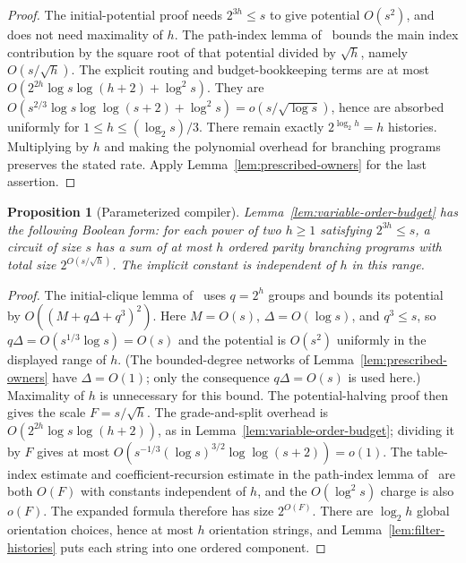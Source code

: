 \documentclass[11pt]{article}
\newtheorem{proposition}[theorem]{Proposition}
\theoremstyle{definition}
\theoremstyle{remark}
\begin{document}
\begin{proof}
The initial-potential proof needs $2^{3h}\le s$ to give potential
$O(s^2)$, and does not need maximality of $h$. The path-index lemma
of~\cite{Cruz26} bounds the main index contribution by the square
root of that potential divided by $\sqrt h$, namely $O(s/\sqrt h)$.
The explicit routing and budget-bookkeeping terms are at most
$O(2^{2h}\log s\log(h+2)+\log^2s)$. They are
$O(s^{2/3}\log s\log\log(s+2)+\log^2s)
 =o(s/\sqrt{\log s})$, hence are absorbed uniformly for
$1\le h\le(\log_2s)/3$. There remain exactly
$2^{\log_2h}=h$ histories. Multiplying by $h$ and making the
polynomial overhead for branching programs preserves the stated
rate. Apply Lemma~\ref{lem:prescribed-owners} for the last assertion.
\end{proof}

\begin{proposition}[Parameterized compiler]
\label{prop:parameterized-parity-compiler}
Lemma~\ref{lem:variable-order-budget} has the following Boolean form:
for each power of two $h\ge1$ satisfying
$2^{3h}\le s$, a circuit of size $s$ has a sum of at most $h$ ordered
parity branching programs with total size $2^{O(s/\sqrt h)}$.
The implicit constant is independent of $h$ in this range.
\end{proposition}
\begin{proof}
The initial-clique lemma of~\cite{Cruz26}
uses $q=2^h$ groups and bounds its potential by
$O((M+q\Delta+q^3)^2)$.
Here $M=O(s)$, $\Delta=O(\log s)$, and $q^3\le s$, so
$q\Delta=O(s^{1/3}\log s)=O(s)$ and the potential is $O(s^2)$
uniformly in the displayed range of $h$. (The bounded-degree networks
of Lemma~\ref{lem:prescribed-owners} have $\Delta=O(1)$; only the
consequence $q\Delta=O(s)$ is used here.)
Maximality of $h$ is unnecessary for this bound.
The potential-halving proof then gives the scale $F=s/\sqrt h$.
The grade-and-split overhead is
$O(2^{2h}\log s\log(h+2))$, as in Lemma~\ref{lem:variable-order-budget};
dividing it by $F$ gives at most
$O(s^{-1/3}(\log s)^{3/2}\log\log(s+2))=o(1)$.
The table-index estimate and coefficient-recursion estimate in the
path-index lemma of~\cite{Cruz26} are both $O(F)$ with constants
independent of $h$, and the $O(\log^2s)$ charge is also $o(F)$.
The expanded formula therefore has size $2^{O(F)}$.
There are $\log_2h$ global orientation choices, hence at most $h$
orientation strings, and Lemma~\ref{lem:filter-histories} puts each
string into one ordered component.
\end{proof}
\end{document}
